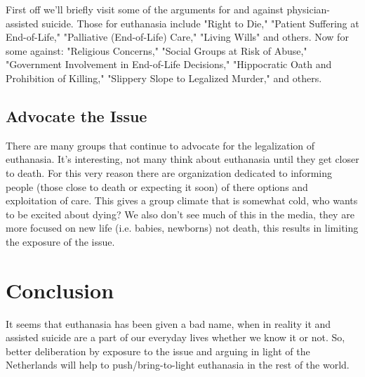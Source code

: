 \documentclass[journal]{IEEEtran}
\begin{document}
First off we'll briefly visit some of the arguments for and against physician-assisted suicide.  Those for euthanasia include "Right to Die," "Patient Suffering at End-of-Life," "Palliative (End-of-Life) Care," "Living Wills" and others.  Now for some against: "Religious Concerns," "Social Groups at Risk of Abuse," "Government Involvement in End-of-Life Decisions," "Hippocratic Oath and Prohibition of Killing," "Slippery Slope to Legalized Murder," and others.

\subsection{Advocate the Issue}

There are many groups that continue to advocate for the legalization of euthanasia. It's interesting, not many think about euthanasia until they get closer to death.  For this very reason there are organization dedicated to informing people (those close to death or expecting it soon) of there options and exploitation of care.  This gives a group climate that is somewhat cold, who wants to be excited about dying? We also don't see much of this in the media, they are more focused on new life (i.e. babies, newborns) not death, this results in limiting the exposure of the issue. 

\section{Conclusion}

It seems that euthanasia has been given a bad name, when in reality it and assisted suicide are a part of our everyday lives whether we know it or not.  So, better deliberation by exposure to the issue and arguing in light of the Netherlands will help to push/bring-to-light euthanasia in the rest of the world.



\end{document}
